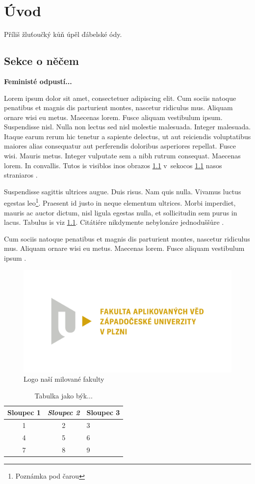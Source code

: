 \documentclass[12pt, a4paper]{report}
\begin{document}
\chapter{Úvod}
Příliš žluťoučký kůň úpěl ďábelské ódy.

\section{Sekce o něčem}
\label{sec:necem}
{\color{success}\bfseries Feministé odpustí...}

Lorem ipsum dolor sit amet, consectetuer adipiscing elit. Cum sociis natoque penatibus et magnis dis parturient montes,
nascetur ridiculus mus. Aliquam ornare wisi eu metus. Maecenas lorem. Fusce aliquam vestibulum ipsum. Suspendisse nisl.
Nulla non lectus sed nisl molestie malesuada. Integer malesuada. Itaque earum rerum hic tenetur a sapiente delectus, ut
aut reiciendis voluptatibus maiores alias consequatur aut perferendis doloribus asperiores repellat. Fusce wisi. Mauris
metus. Integer vulputate sem a nibh rutrum consequat. Maecenas lorem. In convallis. Tutos is visiblos inos obrazos
\ref{fig:fav} v~sekocos \ref{sec:necem} nasos straniaros \pageref{fig:fav}.

Suspendisse sagittis ultrices augue. Duis risus. Nam quis nulla. Vivamus luctus egestas leo\footnote{Poznámka pod čarou}.
Praesent id justo in neque elementum ultrices. Morbi imperdiet, mauris ac auctor dictum, nisl ligula egestas nulla, et
sollicitudin sem purus in lacus. Tabulus is viz \ref{tab:stehno}. Citátiére nikdymente nebylonáre jednoduššůre
\cite{KnuthAOCP2}.

Cum sociis natoque penatibus et magnis dis parturient montes, nascetur ridiculus mus. Aliquam ornare wisi eu metus.
Maecenas lorem. Fusce aliquam vestibulum ipsum \cite{KnuthAOCP2}.

\begin{figure}
    \centering
    \includegraphics[width=.3\textwidth]{fav}
    \caption{Logo naší milované fakulty}
    \label{fig:fav}
\end{figure}

\begin{table}%
    \centering
    \caption{Tabulka jako býk...}
    \begin{tabular}{ccp{3cm}}
        \hline
        \bfseries Sloupec 1 & \itshape Sloupec 2 & Sloupec 3 \\ \hline\hline
        1 & 2 & 3 \\ 
        4 & 5 & 6 \\
        7 & 8 & 9 \\ \hline
    \end{tabular}
    \label{tab:stehno}
\end{table}
\end{document}
